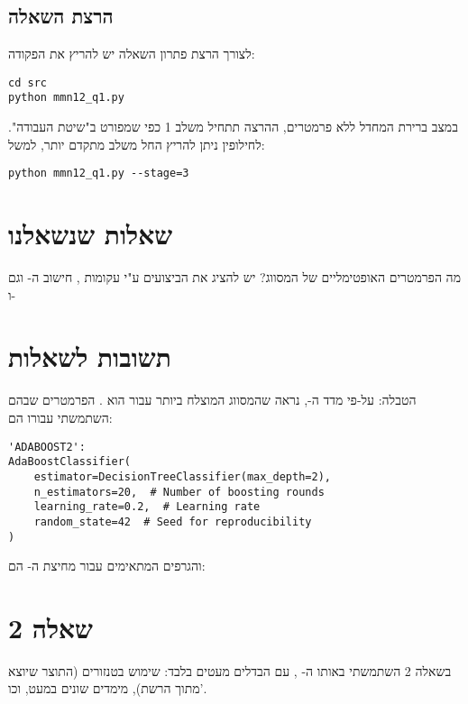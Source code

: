 \subsection*{הרצת השאלה}
לצורך הרצת פתרון השאלה יש להריץ את הפקודה:
\EN
\begin{framed}
\begin{verbatim}
cd src
python mmn12_q1.py
\end{verbatim}
\end{framed}
\HE
במצב ברירת המחדל ללא פרמטרים, ההרצה תתחיל משלב 1 כפי שמפורט ב"שיטת העבודה".
לחילופין ניתן להריץ החל משלב מתקדם יותר, למשל:
\EN
\begin{framed}
\begin{verbatim}
python mmn12_q1.py --stage=3
\end{verbatim}
\end{framed}
\HE

\section*{שאלות שנשאלנו}
מה הפרמטרים האופטימליים של המסווג?\newline
יש להציג את הביצועים ע"י עקומות 
, חישוב ה- וגם  ו-  
\section*{תשובות לשאלות}
הטבלה:
\HE
על-פי מדד ה-, נראה שהמסווג המוצלח ביותר עבור  הוא . הפרמטרים שבהם השתמשתי עבורו הם:
\EN
\begin{lstlisting}
'ADABOOST2':
AdaBoostClassifier(
    estimator=DecisionTreeClassifier(max_depth=2), 
    n_estimators=20,  # Number of boosting rounds
    learning_rate=0.2,  # Learning rate
    random_state=42  # Seed for reproducibility
)
\end{lstlisting}

\HE
\newpage
והגרפים המתאימים עבור מחיצת ה- הם:

\clearpage
\newpage
\HE
\section*{שאלה {2}}
בשאלה 2 השתמשתי באותו ה-  , עם הבדלים מעטים בלבד: שימוש בטנזורים (התוצר שיוצא מתוך הרשת), מימדים שונים במעט, וכו'.

